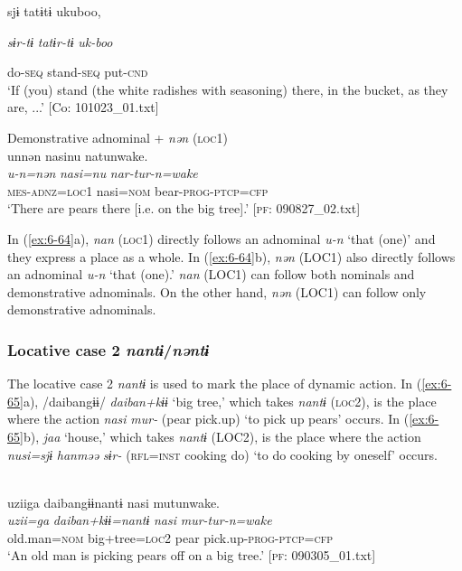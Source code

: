 \begin{table}
      sjɨ  tatɨtɨ  ukuboo,

      \textit{sɨr-tɨ}  \textit{tatɨr-tɨ}  \textit{uk-boo}

      do-\textsc{seq}  stand-\textsc{seq}  put-\textsc{cnd}\\
\glt ‘If (you) stand (the white radishes with seasoning) there, in the bucket, as they are, ...’ [Co: 101023\_01.txt]
\z

\ex Demonstrative adnominal + \textit{nən} (\textsc{loc}1)\\
{\TM}
\glll  unnən  nasinu  natunwake.\\
\textit{u-n=nən}  \textit{nasi=nu}  \textit{nar-tur-n=wake}\\
\textsc{mes}-\textsc{adnz}=\textsc{loc}1  nasi=\textsc{nom}  bear-\textsc{prog}-\textsc{ptcp}=\textsc{cfp}\\
\glt ‘There are pears there [i.e. on the big tree].’ [\textsc{pf}: 090827\_02.txt]
\z

In (\ref{ex:6-64}a), \textit{nan} (\textsc{loc}1) directly follows an adnominal \textit{u-n} ‘that (one)’ and they express a place as a whole. In (\ref{ex:6-64}b), \textit{nən} (LOC1) also directly follows an adnominal \textit{u-n} ‘that (one).’ \textit{nan} (LOC1) can follow both nominals and demonstrative adnominals. On the other hand, \textit{nən} (LOC1) can follow only demonstrative adnominals.

\subsubsection{Locative case 2 \textit{nantɨ}/\textit{nəntɨ}}

The locative case 2 \textit{nantɨ} is used to mark the place of dynamic action. In (\ref{ex:6-65}a), /daibangɨɨ/ \textit{daiban+kɨɨ} ‘big tree,’ which takes \textit{nantɨ} (\textsc{loc}2), is the place where the action \textit{nasi} \textit{mur-} (pear pick.up) ‘to pick up pears’ occurs. In (\ref{ex:6-65}b), \textit{jaa} ‘house,’ which takes \textit{nantɨ} (LOC2), is the place where the action \textit{nusi=sjɨ} \textit{hanməə} \textit{sɨr-} (\textsc{rfl}=\textsc{inst} cooking do) ‘to do cooking by oneself’ occurs.

\ea\label{ex:6-65}
\ea\relax[= \REF{ex:6-53}]\\
{\TM}
\glll  uziiga  daibangɨɨnantɨ  nasi  mutunwake.\\
\textit{uzii=ga}  \textit{daiban+kɨɨ=nantɨ}  \textit{nasi}  \textit{mur-tur-n=wake}\\
old.man=\textsc{nom}  big+tree=\textsc{loc}2  pear  pick.up-\textsc{prog}-\textsc{ptcp}=\textsc{cfp}\\
\glt ‘An old man is picking pears off on a big tree.’ [\textsc{pf}: 090305\_01.txt]
\z


\end{table}

